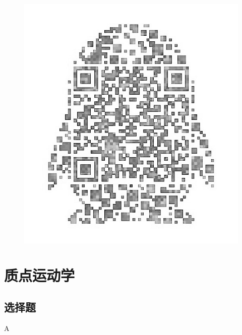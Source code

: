 \documentclass[b5paper,opensource,sourcefont,parskip]{qyxf-book}
\begin{document}
\begin{figure}[!h]
\begin{minipage}[c]{0.5\textwidth}
		\includegraphics[scale=0.42]{qxf.jpg}
	\end{minipage}
\end{figure}


\cleardoublepage

\tableofcontents

\setlength{\parindent}{0pt}
\chapter{质点运动学}
\section{选择题}
A
\end{document}
